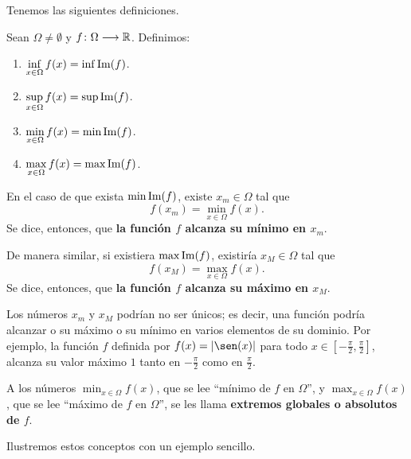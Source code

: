 Tenemos las siguientes definiciones.

\begin{defical}
Sean $\Omega\neq\emptyset$ y $f\colon \Omega\longrightarrow \mathbb{R}$. Definimos:
\begin{enumerate}
\item $\displaystyle\inf_{x\in\Omega} f(x) = \inf\operatorname{Im}(f)$.
\item $\displaystyle\sup_{x\in\Omega} f(x) = \sup\operatorname{Im}(f)$.
\item $\displaystyle\min_{x\in\Omega} f(x) = \min\operatorname{Im}(f)$.
\item $\displaystyle\max_{x\in\Omega} f(x) = \max\operatorname{Im}(f)$.
\end{enumerate}
\end{defical}

En el caso de que exista $\min\operatorname{Im}(f)$, existe $x_m\in\Omega$ tal que
\[
f(x_m) = \min_{x\in\Omega} f(x).
\]
Se dice, entonces, que \textbf{la función $f$ alcanza su mínimo en $x_m$}.

De manera similar, si existiera $\max\operatorname{Im}(f)$, existiría $x_M\in\Omega$ tal que
\[
f(x_M) = \max_{x\in\Omega} f(x).
\]
Se dice, entonces, que \textbf{la función $f$ alcanza su máximo en $x_M$}.

Los números $x_m$ y $x_M$ podrían no ser únicos; es decir, una función podría alcanzar o su máximo
o su mínimo en varios elementos de su dominio. Por ejemplo, la función $f$ definida por $f(x) =
|\sen(x)|$ para todo $x \in [-\frac{\pi}{2},\frac{\pi}{2}]$, alcanza su valor máximo $1$ tanto en
$-\frac{\pi}{2}$ como en $\frac{\pi}{2}$.

A los números $\displaystyle\min_{x\in\Omega} f(x)$, que se lee ``mínimo de $f$ en $\Omega$'', y
$\displaystyle\max_{x\in\Omega} f(x)$, que se lee ``máximo de $f$ en $\Omega$'', se les llama
\textbf{extremos globales o absolutos de $f$}.

Ilustremos estos conceptos con un ejemplo sencillo.

